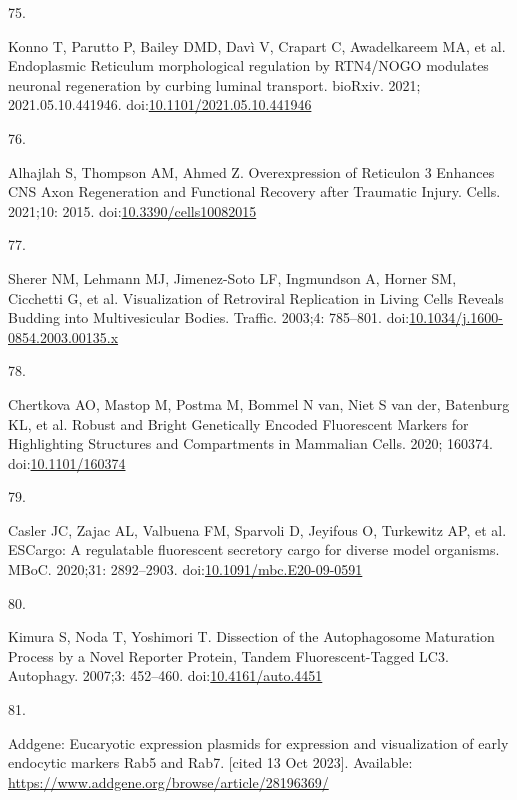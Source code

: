 \documentclass[
  12pt,
  a4paper,
]{book}
\newlength{\cslhangindent}
\newlength{\csllabelwidth}
\newlength{\cslentryspacingunit} %
\newenvironment{CSLReferences}[2] %
 {%
  \setlength{\parindent}{0pt}
  \ifodd #1
  \let\oldpar\par
  \def\par{\hangindent=\cslhangindent\oldpar}
  \fi
  \setlength{\parskip}{#2\cslentryspacingunit}
 }%
 {}
\newcommand{\CSLLeftMargin}[1]{\parbox[t]{\csllabelwidth}{#1}}
\newcommand{\CSLRightInline}[1]{\parbox[t]{\linewidth - \csllabelwidth}{#1}\break}
\begin{document}
\begin{CSLReferences}{0}{0}
\leavevmode{}%
\CSLLeftMargin{75. }%
\CSLRightInline{Konno T, Parutto P, Bailey DMD, Davì V, Crapart C, Awadelkareem MA, et al. Endoplasmic {Reticulum} morphological regulation by {RTN4}/{NOGO} modulates neuronal regeneration by curbing luminal transport. bioRxiv. 2021; 2021.05.10.441946. doi:\href{https://doi.org/10.1101/2021.05.10.441946}{10.1101/2021.05.10.441946}}

\leavevmode{}%
\CSLLeftMargin{76. }%
\CSLRightInline{Alhajlah S, Thompson AM, Ahmed Z. Overexpression of {Reticulon} 3 {Enhances CNS Axon Regeneration} and {Functional Recovery} after {Traumatic Injury}. Cells. 2021;10: 2015. doi:\href{https://doi.org/10.3390/cells10082015}{10.3390/cells10082015}}

\leavevmode{}%
\CSLLeftMargin{77. }%
\CSLRightInline{Sherer NM, Lehmann MJ, Jimenez-Soto LF, Ingmundson A, Horner SM, Cicchetti G, et al. Visualization of {Retroviral Replication} in {Living Cells Reveals Budding} into {Multivesicular Bodies}. Traffic. 2003;4: 785--801. doi:\href{https://doi.org/10.1034/j.1600-0854.2003.00135.x}{10.1034/j.1600-0854.2003.00135.x}}

\leavevmode{}%
\CSLLeftMargin{78. }%
\CSLRightInline{Chertkova AO, Mastop M, Postma M, Bommel N van, Niet S van der, Batenburg KL, et al. Robust and {Bright Genetically Encoded Fluorescent Markers} for {Highlighting Structures} and {Compartments} in {Mammalian Cells}. 2020; 160374. doi:\href{https://doi.org/10.1101/160374}{10.1101/160374}}

\leavevmode{}%
\CSLLeftMargin{79. }%
\CSLRightInline{Casler JC, Zajac AL, Valbuena FM, Sparvoli D, Jeyifous O, Turkewitz AP, et al. {ESCargo}: A regulatable fluorescent secretory cargo for diverse model organisms. MBoC. 2020;31: 2892--2903. doi:\href{https://doi.org/10.1091/mbc.E20-09-0591}{10.1091/mbc.E20-09-0591}}

\leavevmode{}%
\CSLLeftMargin{80. }%
\CSLRightInline{Kimura S, Noda T, Yoshimori T. Dissection of the {Autophagosome Maturation Process} by a {Novel Reporter Protein}, {Tandem Fluorescent-Tagged LC3}. Autophagy. 2007;3: 452--460. doi:\href{https://doi.org/10.4161/auto.4451}{10.4161/auto.4451}}

\leavevmode{}%
\CSLLeftMargin{81. }%
\CSLRightInline{Addgene: {Eucaryotic} expression plasmids for expression and visualization of early endocytic markers {Rab5} and {Rab7}. {[}cited 13 Oct 2023{]}. Available: \url{https://www.addgene.org/browse/article/28196369/}}


\end{CSLReferences}
\end{document}
